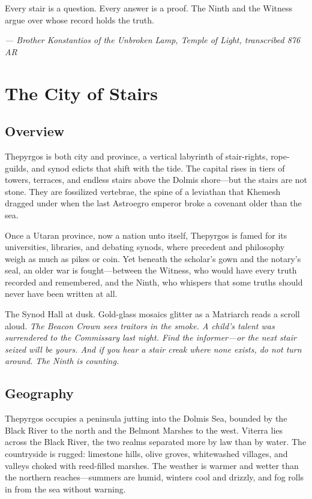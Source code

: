 \documentclass[10pt,twocolumn]{book}
\begin{document}



\thispagestyle{empty}

\clearpage
\thispagestyle{empty}
\epigraph{Every stair is a question. Every answer is a proof. The Ninth and the Witness argue over whose record holds the truth.}{\textit{--- Brother Konstantios of the Unbroken Lamp, Temple of Light, transcribed 876 AR}}

\tableofcontents
\clearpage


\chapter{The City of Stairs}
\section{Overview}

Thepyrgos is both city and province, a vertical labyrinth of stair-rights, rope-guilds, and synod edicts that shift with the tide. The capital rises in tiers of towers, terraces, and endless stairs above the Dolmis shore---but the stairs are not stone. They are fossilized vertebrae, the spine of a leviathan that Khemesh dragged under when the last Astroegro emperor broke a covenant older than the sea.

Once a Utaran province, now a nation unto itself, Thepyrgos is famed for its universities, libraries, and debating synods, where precedent and philosophy weigh as much as pikes or coin. Yet beneath the scholar's gown and the notary's seal, an older war is fought---between the Witness, who would have every truth recorded and remembered, and the Ninth, who whispers that some truths should never have been written at all.

\begin{sidequote}
The Synod Hall at dusk. Gold-glass mosaics glitter as a Matriarch reads a scroll aloud. \textit{The Beacon Crown sees traitors in the smoke. A child's talent was surrendered to the Commissary last night. Find the informer---or the next stair seized will be yours. And if you hear a stair creak where none exists, do not turn around. The Ninth is counting.}
\end{sidequote}

\section{Geography}

Thepyrgos occupies a peninsula jutting into the Dolmis Sea, bounded by the Black River to the north and the Belmont Marshes to the west. Viterra lies across the Black River, the two realms separated more by law than by water. The countryside is rugged: limestone hills, olive groves, whitewashed villages, and valleys choked with reed-filled marshes. The weather is warmer and wetter than the northern reaches---summers are humid, winters cool and drizzly, and fog rolls in from the sea without warning.
\end{document}
